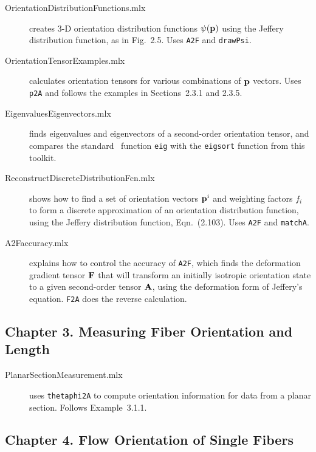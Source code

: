 \documentclass[11pt]{article}
\begin{document}
\begin{description}
    
    \item[OrientationDistributionFunctions.mlx]{creates 3-D orientation distribution functions $\psi(\mathbf{p})$ using the Jeffery distribution function, as in Fig.~2.5.  Uses \texttt{A2F} and \texttt{drawPsi}.}
    
    \item[OrientationTensorExamples.mlx]{calculates orientation tensors for various combinations of $\mathbf{p}$ vectors.  Uses \texttt{p2A} and follows the examples in Sections~2.3.1 and 2.3.5.}

    \item[EigenvaluesEigenvectors.mlx]{finds eigenvalues and eigenvectors of a second-order orientation tensor, and compares the standard \matlab\ function \texttt{eig} with the \texttt{eigsort} function from this toolkit.}
    
    \item[ReconstructDiscreteDistributionFcn.mlx]{shows how to find a set of orientation vectors $\mathbf{p}^i$ and weighting factors $f_i$ to form a discrete approximation of an orientation distribution function, using the Jeffery distribution function, Eqn.~(2.103).  Uses \texttt{A2F} and \texttt{matchA}. }

        \item[A2Faccuracy.mlx]{explains how to control the accuracy of \texttt{A2F}, which finds the deformation gradient tensor $\mathbf{F}$ that will transform an initially isotropic orientation state to a given second-order tensor $\mathbf{A}$, using the deformation form of Jeffery's equation.  \texttt{F2A} does the reverse calculation.}    
        
\end{description}

\subsection*{Chapter 3.  Measuring Fiber Orientation and Length}

\begin{description}
    
    \item[PlanarSectionMeasurement.mlx]{uses \texttt{thetaphi2A} to compute orientation information for data from a planar section.  Follows Example~3.1.1.}
      
\end{description}

\subsection*{Chapter 4. Flow Orientation of Single Fibers}
\end{document}

